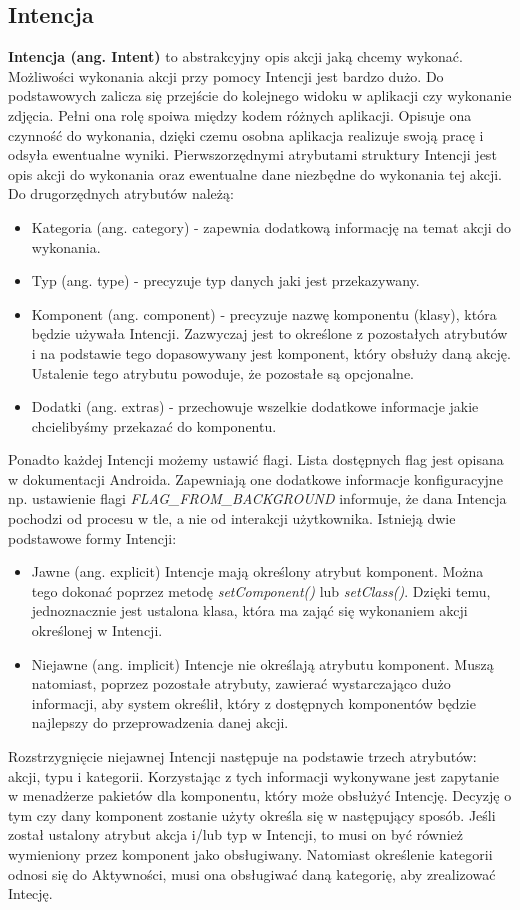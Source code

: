 \subsection{Intencja}
\textbf{Intencja (ang. Intent)} to abstrakcyjny opis akcji jaką chcemy wykonać. Możliwości wykonania akcji przy pomocy Intencji jest bardzo dużo. Do podstawowych zalicza się przejście do kolejnego widoku w aplikacji czy wykonanie zdjęcia. Pełni ona rolę spoiwa między kodem różnych aplikacji. Opisuje ona czynność do wykonania, dzięki czemu osobna aplikacja realizuje swoją pracę i odsyła ewentualne wyniki. Pierwszorzędnymi atrybutami struktury Intencji jest opis akcji do wykonania oraz ewentualne dane niezbędne do wykonania tej akcji. Do drugorzędnych atrybutów należą:
\begin{itemize}
\item Kategoria (ang. category) - zapewnia dodatkową informację na temat akcji do wykonania.
\item Typ (ang. type) - precyzuje typ danych jaki jest przekazywany.
\item Komponent (ang. component) - precyzuje nazwę komponentu (klasy), która będzie używała Intencji. Zazwyczaj jest to określone z pozostałych atrybutów i na podstawie tego dopasowywany jest komponent, który obsłuży daną akcję. Ustalenie tego atrybutu powoduje, że pozostałe są opcjonalne.
\item Dodatki (ang. extras) - przechowuje wszelkie dodatkowe informacje jakie chcielibyśmy przekazać do komponentu.
\end{itemize}
Ponadto każdej Intencji możemy ustawić flagi. Lista dostępnych flag jest opisana w dokumentacji Androida. Zapewniają one dodatkowe informacje konfiguracyjne np. ustawienie flagi \textit{FLAG\_FROM\_BACKGROUND} informuje, że dana Intencja pochodzi od procesu w tle, a nie od interakcji użytkownika.
Istnieją dwie podstawowe formy Intencji:
\begin{itemize}
    \item Jawne (ang. explicit) Intencje mają określony atrybut komponent. Można tego dokonać poprzez metodę \textit{setComponent()} lub \textit{setClass()}. Dzięki temu, jednoznacznie jest ustalona klasa, która ma zająć się wykonaniem akcji określonej w Intencji.
    \item Niejawne (ang. implicit) Intencje nie określają atrybutu komponent. Muszą natomiast, poprzez pozostałe atrybuty, zawierać wystarczająco dużo informacji, aby system określił, który z dostępnych komponentów będzie najlepszy do przeprowadzenia danej akcji.
\end{itemize}
Rozstrzygnięcie niejawnej Intencji następuje na podstawie trzech atrybutów: akcji, typu i kategorii. Korzystając z tych informacji wykonywane jest zapytanie w menadżerze pakietów dla komponentu, który może obsłużyć Intencję. Decyzję o tym czy dany komponent zostanie użyty określa się w następujący sposób. Jeśli został ustalony atrybut akcja i/lub typ w Intencji, to musi on być również wymieniony przez komponent jako obsługiwany.  Natomiast określenie kategorii odnosi się do Aktywności, musi ona obsługiwać daną kategorię, aby zrealizować Intecję.\cite{intent}
